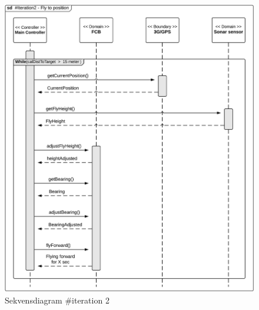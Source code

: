 \begin{figure}[H]
	\centering
	\includegraphics[width=1\textwidth]{Billeder/sekvens/sekvens_iteration2_3}
	\caption{Sekvensdiagram \#iteration 2}
	\label{fig:Sekvens_diagram_iteration2_3}
\end{figure}
